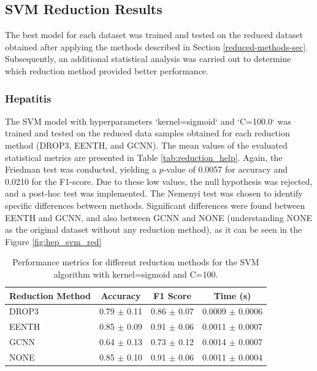 \subsection{SVM Reduction Results}
The best model for each dataset was trained and tested on the reduced dataset obtained after applying the methods described in Section \ref{reduced-methods-sec}. Subsequently, an additional statistical analysis was carried out to determine which reduction method provided better performance.

\subsubsection{Hepatitis}
The SVM model with hyperparameters `kernel=sigmoid` and `C=100.0` was trained and tested on the reduced data samples obtained for each reduction method (DROP3, EENTH, and GCNN). The mean values of the evaluated statistical metrics are presented in Table \ref{tab:reduction_help}. Again, the Friedman test was conducted, yielding a $p$-value of 0.0057 for accuracy and 0.0210 for the F1-score. Due to these low values, the null hypothesis was rejected, and a post-hoc test was implemented. The Nemenyi test was chosen to identify specific differences between methods. Significant differences were found between EENTH and GCNN, and also between GCNN and NONE (understanding NONE as the original dataset without any reduction method), as it can be seen in the Figure \ref{fig:hep_svm_red} 

\begin{table}[h!]
\centering
\begin{tabular}{|l|c|c|c|}
\hline
\textbf{Reduction Method} & \textbf{Accuracy} & \textbf{F1 Score} & \textbf{Time (s)} \\
\hline
DROP3 & 0.79 $\pm$ 0.11 & 0.86 $\pm$ 0.07 & 0.0009 $\pm$ 0.0006 \\
\hline
EENTH & 0.85 $\pm$ 0.09 & 0.91 $\pm$ 0.06 & 0.0011 $\pm$ 0.0007 \\
\hline
GCNN  & 0.64 $\pm$ 0.13 & 0.73 $\pm$ 0.12 & 0.0014 $\pm$ 0.0007 \\
\hline
NONE  & 0.85 $\pm$ 0.10 & 0.91 $\pm$ 0.06 & 0.0011 $\pm$ 0.0004 \\
\hline
\end{tabular}
\caption{Performance metrics for different reduction methods for the SVM algorithm with kernel=sigmoid and C=100.}
\label{tab:reduction_hep}
\end{table}

